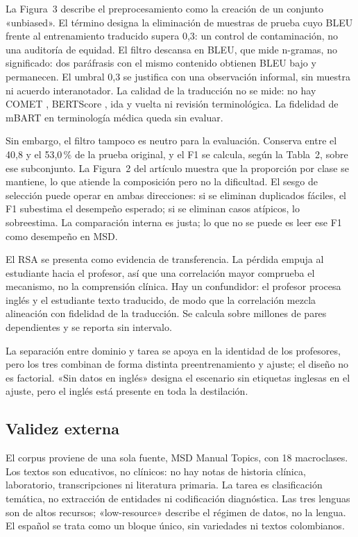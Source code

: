 La Figura~3 describe el preprocesamiento como la creación de un conjunto «unbiased». El término designa la eliminación de muestras de prueba cuyo BLEU frente al entrenamiento traducido supera 0,3: un control de contaminación, no una auditoría de equidad. El filtro descansa en BLEU, que mide n-gramas, no significado: dos paráfrasis con el mismo contenido obtienen BLEU bajo y permanecen. El umbral 0,3 se justifica con una observación informal, sin muestra ni acuerdo interanotador. La calidad de la traducción no se mide: no hay COMET \cite{rei2020}, BERTScore \cite{zhang2020}, ida y vuelta ni revisión terminológica. La fidelidad de mBART en terminología médica queda sin evaluar.

Sin embargo, el filtro tampoco es neutro para la evaluación. Conserva entre el 40,8 y el 53,0\,\% de la prueba original, y el F1 se calcula, según la Tabla~2, sobre ese subconjunto. La Figura~2 del artículo muestra que la proporción por clase se mantiene, lo que atiende la composición pero no la dificultad. El sesgo de selección puede operar en ambas direcciones: si se eliminan duplicados fáciles, el F1 subestima el desempeño esperado; si se eliminan casos atípicos, lo sobreestima. La comparación interna es justa; lo que no se puede es leer ese F1 como desempeño en MSD.

El RSA se presenta como evidencia de transferencia. La pérdida empuja al estudiante hacia el profesor, así que una correlación mayor comprueba el mecanismo, no la comprensión clínica. Hay un confundidor: el profesor procesa inglés y el estudiante texto traducido, de modo que la correlación mezcla alineación con fidelidad de la traducción. Se calcula sobre millones de pares dependientes y se reporta sin intervalo.

La separación entre dominio y tarea se apoya en la identidad de los profesores, pero los tres combinan de forma distinta preentrenamiento y ajuste; el diseño no es factorial. «Sin datos en inglés» designa el escenario sin etiquetas inglesas en el ajuste, pero el inglés está presente en toda la destilación.

\subsection{Validez externa}

El corpus proviene de una sola fuente, MSD Manual Topics, con 18 macroclases. Los textos son educativos, no clínicos: no hay notas de historia clínica, laboratorio, transcripciones ni literatura primaria. La tarea es clasificación temática, no extracción de entidades ni codificación diagnóstica. Las tres lenguas son de altos recursos; «low-resource» describe el régimen de datos, no la lengua. El español se trata como un bloque único, sin variedades ni textos colombianos.

